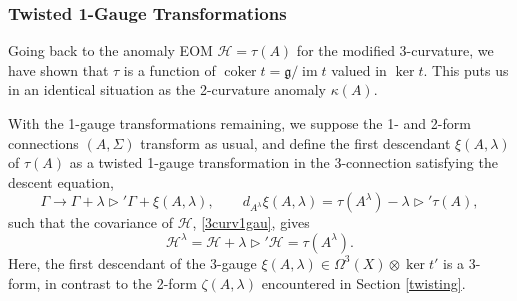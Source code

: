 \documentclass[onecolumn]{article}
\theoremstyle{theorem}
\theoremstyle{remark}
\newtheorem{remark}{Remark}[section]
\theoremstyle{example}
\theoremstyle{definition}
\numberwithin{equation}{section}
\def\g{\mathfrak g}
\begin{document}





\subsubsection{Twisted 1-Gauge Transformations} Going back to the anomaly EOM $\mathcal{H}=\tau(A)$ for the modified 3-curvature, we have shown that $\tau$ is a function of $\operatorname{coker}t = \g/\operatorname{im}t$ valued in $\operatorname{ker}t$. This puts us in an identical situation as the 2-curvature anomaly $\kappa(A)$. 

With the 1-gauge transformations remaining, we suppose the 1- and 2-form connections $(A,\Sigma)$ transform as usual, and define the first descendant $\xi(A,\lambda)$ of $\tau(A)$ as a twisted 1-gauge transformation in the 3-connection satisfying the descent equation,
\begin{equation}
    \Gamma \rightarrow \Gamma + \lambda\rhd'\Gamma + \xi(A,\lambda),\qquad  d_{A^\lambda}\xi(A,\lambda) = \tau(A^\lambda) - \lambda\rhd'\tau(A),\nonumber
\end{equation}
such that the covariance of $\mathcal{H}$,  \eqref{3curv1gau}, gives
\begin{equation}
    \mathcal{H}^\lambda = \mathcal{H} + \lambda\rhd'\mathcal{H} = \tau(A^\lambda).\nonumber
\end{equation}
{Here}, the first descendant of the 3-gauge $\xi(A,\lambda) \in \Omega^3(X)\otimes\operatorname{ker}t'$ is a 3-form, in contrast to the 2-form $\zeta(A,\lambda)$ encountered in Section \ref{twisting}. 
\end{document}
